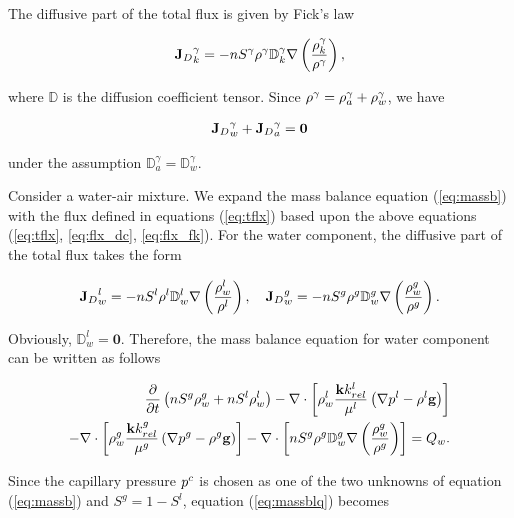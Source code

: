 The diffusive part of the total flux is given by Fick's law

\begin{align}
{{\FlxDf}_D}_k^{\gamma}=-\poro \sat^{\gamma}  \dens^{\gamma} {\mathbb D}_k^{\gamma} \nabla \left(\dfrac{\dens_k^{\gamma}}{\dens^{\gamma}}\right),
\label{eq:flx_fk}
\end{align}

where $\mathbb D$ is the diffusion coefficient tensor. Since $\rho^{\gamma} = \rho_a^{\gamma}+\rho_w^{\gamma}$, we have

 \begin{align}
{{\FlxDf}_D}_w^{\gamma}+{{\FlxDf}_D}_a^{\gamma}=\mathbf 0
\label{eq:dufblc}
\end{align}

under the assumption ${\mathbb D}_a^{\gamma}  = {\mathbb D}_w^{\gamma} $.

Consider a water-air mixture. We expand the mass balance equation (\ref{eq:massb}) with the flux defined in equations (\ref{eq:tflx}) based upon the above equations (\ref{eq:tflx}, \ref{eq:flx_dc}, \ref{eq:flx_fk}). For the water component, the diffusive part of the total flux takes the form

\begin{align}
{{\FlxDf}_D}_w^{l}=-\poro \Sat^{l}  \dens^{l} {\mathbb D}_w^{l} \nabla \left(\dfrac{\dens_w^{l}}{\dens^{l}}\right),\quad
{{\FlxDf}_D}_w^{g}=-\poro \Sat^{g}  \dens^{g} {\mathbb D}_w^{g} \nabla \left(\dfrac{\dens_w^{g}}{\dens^{g}}\right).
\label{eq:flx_fkw}
\end{align}

Obviously, ${\mathbb D}_w^{l} = \mathbf 0$. Therefore, the mass balance equation for water component can be written as follows

\begin{align}
\pD{}{t} \left(\poro S^g\dens_w^g+\poro S^l\dens_w^l\right)-
\nabla \cdot \left[\dens_w^{l}\dfrac{\perm \RelKa^{l}}{\mu^{l}}\left(\nabla \pres^{l}-\dens^{l} \mathbf g\right)\right]\nonumber\\
-\nabla \cdot \left[\dens_w^{g}\dfrac{\perm \RelKa^{g}}{\mu^{g}}\left(\nabla \pres^{g}-\dens^{g} \mathbf g\right)\right] -
\nabla \cdot \left[\poro \Sat^{g}  \dens^{g} {\mathbb D}_w^{g} \nabla \left(\dfrac{\dens_w^{g}}{\dens^{g}}\right)\right] = Q_w.
\label{eq:massblq}
\end{align}

Since the capillary pressure $p^c$  is chosen as one of the two unknowns of equation (\ref{eq:massb}) and $S^g=1-S^l$, equation (\ref{eq:massblq}) becomes

